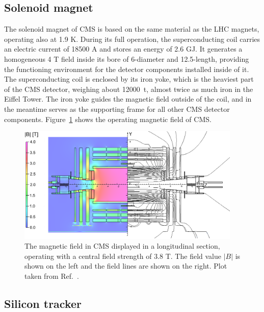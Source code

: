 \subsection{Solenoid magnet}\label{sec:magnet}

The solenoid magnet of CMS is based on the same material as the LHC magnets, operating also at 1.9 K.
During its full operation, the superconducting coil carries an electric current of 18500 A and stores an energy of 2.6 GJ.
It generates a homogeneous 4 T field inside its bore of 6-\meter diameter and 12.5-\meter length,
providing the functioning environment for the detector components installed inside of it.
The superconducting coil is enclosed by its iron yoke, which is the heaviest part of the CMS detector, 
weighing about 12000~t, almost twice as much iron in the Eiffel Tower.
The iron yoke guides the magnetic field outside of the coil, and in the meantime serves as the supporting frame for all other CMS detector components.
Figure~\ref{fig:cms_field} shows the operating magnetic field of CMS.

\begin{figure}[!htb]
    \centering
    \captionsetup{justification=justified}
    \includegraphics[width=0.95\textwidth]{pics/LHC_CMS/CMS_field.png}
    \caption{The magnetic field in CMS displayed in a longitudinal section, operating with a central field strength of 3.8 T.
             The field value $|B|$ is shown on the left and the field lines are shown on the right.
             Plot taken from Ref.~\cite{Collaboration_2010}. }
    \label{fig:cms_field}
\end{figure}


\subsection{Silicon tracker}\label{sec:tracker}

